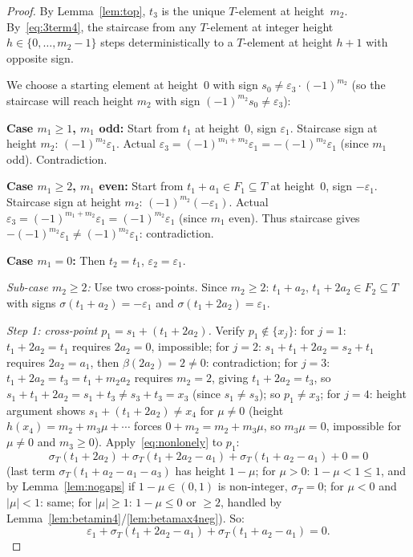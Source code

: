 \documentclass{article}
\begin{document}
\begin{proof}
By Lemma~\ref{lem:top}, $t_3$ is the unique $T$-element at height~$m_2$.
By~\eqref{eq:3term4}, the staircase from any $T$-element at integer height $h\in\{0,\dots,m_2-1\}$
steps deterministically to a $T$-element at height $h+1$ with opposite sign.

We choose a starting element at height~$0$ with sign $s_0\ne\varepsilon_3\cdot(-1)^{m_2}$
(so the staircase will reach height $m_2$ with sign $(-1)^{m_2}s_0\ne\varepsilon_3$):

\textbf{Case $m_1\ge 1$, $m_1$ odd:}
Start from $t_1$ at height~$0$, sign $\varepsilon_1$.
Staircase sign at height $m_2$: $(-1)^{m_2}\varepsilon_1$.
Actual $\varepsilon_3=(-1)^{m_1+m_2}\varepsilon_1=-(-1)^{m_2}\varepsilon_1$ (since $m_1$ odd).
Contradiction.

\textbf{Case $m_1\ge 2$, $m_1$ even:}
Start from $t_1+a_1\in F_1\subseteq T$ at height~$0$, sign $-\varepsilon_1$.
Staircase sign at height $m_2$: $(-1)^{m_2}(-\varepsilon_1)$.
Actual $\varepsilon_3=(-1)^{m_1+m_2}\varepsilon_1=(-1)^{m_2}\varepsilon_1$ (since $m_1$ even).
Thus staircase gives $-(-1)^{m_2}\varepsilon_1\ne(-1)^{m_2}\varepsilon_1$: contradiction.

\textbf{Case $m_1=0$:}
Then $t_2=t_1$, $\varepsilon_2=\varepsilon_1$.

\textit{Sub-case $m_2\ge 2$:}
Use two cross-points.
Since $m_2\ge 2$: $t_1+a_2,\,t_1+2a_2\in F_2\subseteq T$ with signs
$\sigma(t_1+a_2)=-\varepsilon_1$ and $\sigma(t_1+2a_2)=\varepsilon_1$.

\textit{Step 1: cross-point $p_1=s_1+(t_1+2a_2)$.}
Verify $p_1\notin\{x_j\}$: for $j=1$: $t_1+2a_2=t_1$ requires $2a_2=0$, impossible;
for $j=2$: $s_1+t_1+2a_2=s_2+t_1$ requires $2a_2=a_1$, then $\beta(2a_2)=2\ne 0$: contradiction;
for $j=3$: $t_1+2a_2=t_3=t_1+m_2a_2$ requires $m_2=2$, giving $t_1+2a_2=t_3$, so
$s_1+t_1+2a_2=s_1+t_3\ne s_3+t_3=x_3$ (since $s_1\ne s_3$); so $p_1\ne x_3$;
for $j=4$: height argument shows $s_1+(t_1+2a_2)\ne x_4$ for $\mu\ne 0$ (height $h(x_4)=m_2+m_3\mu+\cdots$ forces $0+m_2=m_2+m_3\mu$, so $m_3\mu=0$, impossible for $\mu\ne 0$ and $m_3\ge 0$).
Apply~\eqref{eq:nonlonely} to $p_1$:
\[
  \sigma_T(t_1+2a_2)+\sigma_T(t_1+2a_2-a_1)+\sigma_T(t_1+a_2-a_1)+0=0
\]
(last term $\sigma_T(t_1+a_2-a_1-a_3)$ has height $1-\mu$;
for $\mu>0$: $1-\mu<1\le 1$, and by Lemma~\ref{lem:nogaps} if $1-\mu\in(0,1)$
is non-integer, $\sigma_T=0$; for $\mu<0$ and $|\mu|<1$: same; for $|\mu|\ge 1$: $1-\mu\le 0$ or $\ge 2$, handled by Lemma~\ref{lem:betamin4}/\ref{lem:betamax4neg}).
So:
\begin{equation}\label{eq:cross1}
  \varepsilon_1+\sigma_T(t_1+2a_2-a_1)+\sigma_T(t_1+a_2-a_1)=0.
\end{equation}


\end{proof}
\end{document}
